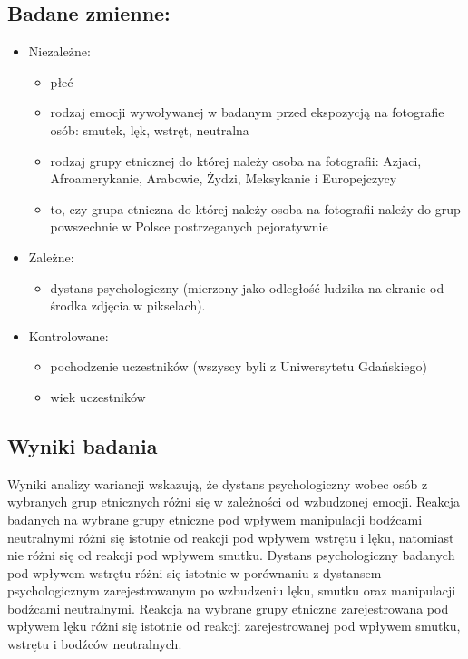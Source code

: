 \documentclass{psychol}
\begin{document}
\subsection{Badane zmienne:}

\begin{itemize}
    \item Niezależne:
    \begin{itemize}
        \item płeć
        \item rodzaj emocji wywoływanej w badanym przed ekspozycją na fotografie osób: smutek, lęk, wstręt, neutralna
        \item rodzaj grupy etnicznej do której należy osoba na fotografii: Azjaci, Afroamerykanie, Arabowie,
        Żydzi, Meksykanie i Europejczycy
        \item to, czy grupa etniczna do której należy osoba na fotografii należy do grup powszechnie w Polsce postrzeganych pejoratywnie
    \end{itemize}
    \item {Zależne:}
    \begin{itemize}
        \item dystans psychologiczny \costam[1][yyyyyy] (mierzony jako odległość ludzika na ekranie od środka zdjęcia w pikselach). \costam[3][yyyyyy]
    \end{itemize}
    \item {Kontrolowane:}
    \begin{itemize}
        \item pochodzenie uczestników (wszyscy byli z Uniwersytetu Gdańskiego)
        \item wiek uczestników
    \end{itemize}
\end{itemize}

\subsection{Wyniki badania}

Wyniki analizy wariancji wskazują, że dystans psychologiczny wobec osób z wybranych grup etnicznych różni
się w zależności od wzbudzonej emocji. Reakcja badanych na wybrane grupy etniczne pod wpływem manipulacji bodźcami neutralnymi różni się istotnie od reakcji pod wpływem wstrętu i lęku, natomiast nie różni się od reakcji pod wpływem smutku. Dystans psychologiczny badanych pod wpływem wstrętu różni
się istotnie w porównaniu z dystansem psychologicznym zarejestrowanym po wzbudzeniu lęku, smutku oraz manipulacji bodźcami neutralnymi. Reakcja na wybrane grupy etniczne zarejestrowana pod wpływem lęku różni się istotnie od reakcji
zarejestrowanej pod wpływem smutku, wstrętu i bodźców neutralnych.
\end{document}
